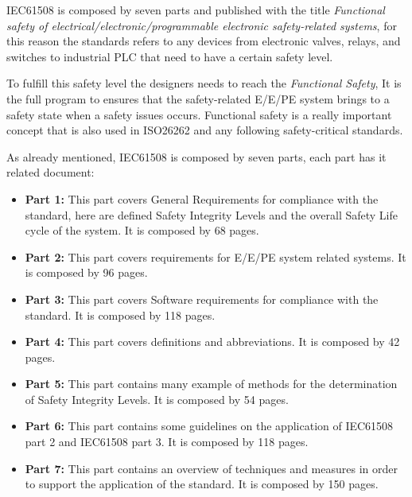 {{{		    
		    IEC61508 is composed by seven parts and published with the title \textit{Functional safety of electrical/electronic/programmable electronic safety-related systems}, for this reason the standards refers to any devices from electronic valves, relays, and switches to industrial PLC that need to have a certain safety level.
		    
		    To fulfill this safety level the designers needs to reach the \textit{Functional Safety}, It is the full program to ensures that the safety-related E/E/PE system brings to a safety state when a safety issues occurs. Functional safety is a really important concept that is also used in ISO26262 and any following safety-critical standards.
		    
		    As already mentioned, IEC61508 is composed by seven parts, each part has it related document:
		    \begin{itemize}
		        \item \textbf{Part 1:} This part covers General Requirements for compliance with the standard, here are defined Safety Integrity Levels and the overall Safety Life cycle of the system. It is composed by 68 pages.
		        \item \textbf{Part 2:} This part covers requirements for E/E/PE system related systems. It is composed by 96 pages.
		        \item \textbf{Part 3:} This part covers Software requirements for compliance with the standard. It is composed by 118 pages.
		        \item \textbf{Part 4:} This part covers definitions and abbreviations. It is composed by 42 pages.
		        \item \textbf{Part 5:} This part contains many example of methods for the determination of Safety Integrity Levels. It is composed by 54 pages.
		        \item \textbf{Part 6:} This part contains some guidelines on the application of IEC61508 part 2 and IEC61508 part 3. It is composed by  118 pages.
		        \item \textbf{Part 7:} This part contains an overview of techniques and measures in order to support the application of the standard. It is composed by 150 pages.
		    \end{itemize}
		    
		    
}}}
